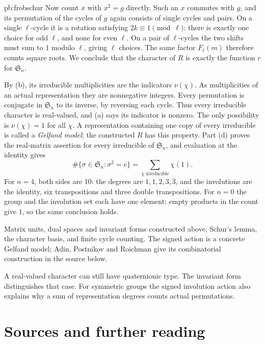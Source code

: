 \begin{solution}{pb:frobschur}
Now count $x$ with $x^2=g$ directly. Such an $x$ commutes with $g$, and its
permutation of the cycles of $g$ again consists of single cycles and pairs.
On a single $\ell$-cycle it is a rotation satisfying $2k\equiv1\pmod\ell$:
there is exactly one choice for odd $\ell$, and none for even $\ell$.
On a pair of $\ell$-cycles the two shifts must sum to $1$ modulo $\ell$,
giving $\ell$ choices.
The same factor $F_\ell(m)$ therefore counts square roots.
We conclude that the character of $R$ is exactly the function $r$ for
$\mathfrak S_n$.

By (b), its irreducible multiplicities are the indicators $\nu(\chi)$.
As multiplicities of an actual representation they are nonnegative integers.
Every permutation is conjugate in $\mathfrak S_n$ to its inverse, by reversing
each cycle. Thus every irreducible character is real-valued, and (a) says
its indicator is nonzero. The only possibility is $\nu(\chi)=1$ for all $\chi$.
A representation containing one copy of every irreducible is called a
\emph{Gelfand model}; the constructed $R$ has this property.
Part (d) proves the real-matrix assertion for every irreducible of
$\mathfrak S_n$, and evaluation at the identity gives
\[
\boxed{\#\{\sigma\in\mathfrak S_n:\sigma^2=e\}
=\sum_{\chi\text{ irreducible}}\chi(1).}
\]
For $n=4$, both sides are $10$: the degrees are $1,1,2,3,3$, and the
involutions are the identity, six transpositions and three double transpositions.
For $n=0$ the group and the involution set each have one element; empty products
in the count give $1$, so the same conclusion holds.

\tools Matrix units, dual spaces and invariant forms constructed above, Schur's lemma,
the character basis, and finite cycle counting. The signed action is a concrete
Gelfand model; Adin, Postnikov and Roichman give its combinatorial construction
in the source below.

\leads A real-valued character can still have quaternionic type. The invariant
form distinguishes that case. For symmetric groups the signed involution action
also explains why a sum of representation degrees counts actual permutations.
\end{solution}

\section*{Sources and further reading}

